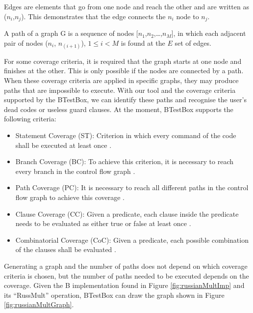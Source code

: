 \documentclass[runningheads]{llncs}
\begin{document}
Edges are elements that go from one node and reach the other and are written as ($n_i$,$n_j$). This demonstrates that the edge connects the $n_i$ node to $n_j$.

A path of a graph G is a sequence of nodes [$n_1$,$n_2$,\ldots,$n_M$], in which each adjacent pair of nodes ($n_i$, $n_{(i+1)}$), $1 \leq i < M$ is found at the $E$ set of edges.

For some coverage criteria, it is required that the graph starts at one node and finishes at the other. This is only possible if the nodes are connected by a path. When these coverage criteria are applied in specific graphs, they may produce paths that are impossible to execute. With our tool and the coverage criteria supported by the BTestBox, we can identify these paths and recognise the user's dead codes or useless guard clauses. At the moment, BTestBox supports the following criteria:

\begin{itemize}
    \item Statement Coverage (ST): Criterion in which every command of the code shall be executed at least once \cite{ammann2008introduction}.
    \item Branch Coverage (BC): To achieve this criterion, it is necessary to reach every branch in the control flow graph \cite{ammann2008introduction}.
    \item Path Coverage (PC): It is necessary to reach all different paths in the control flow graph to achieve this coverage \cite{ammann2008introduction}.
    \item Clause Coverage (CC): Given a predicate, each clause inside the predicate needs to be evaluated as either true or false at least once \cite{ammann2003coverage}.
    \item Combinatorial Coverage (CoC): Given a predicate, each possible combination of the clauses shall be evaluated \cite{ammann2003coverage}.
\end{itemize}

Generating a graph and the number of paths does not depend on which coverage criteria is chosen, but the number of paths needed to be executed depends on the coverage. Given the B implementation found in Figure \ref{fig:russianMultImp} and its ``RussMult'' operation, BTestBox can draw the graph shown in Figure \ref{fig:russianMultGraph}.

        
\end{document}
